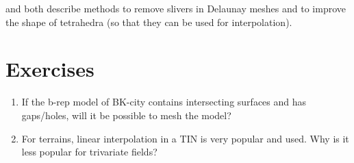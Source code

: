 \citet{Cheng00} and \citet{Miller02} both describe methods to remove slivers in Delaunay meshes and to improve the shape of tetrahedra (so that they can be used for interpolation).

%
\section{Exercises}

\begin{enumerate}
  \item If the b-rep model of BK-city contains intersecting surfaces and has gaps/holes, will it be possible to mesh the model?
  \item For terrains, linear interpolation in a TIN is very popular and used. Why is it less popular for trivariate fields?
\end{enumerate}
